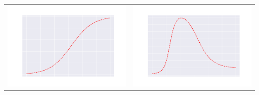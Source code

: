\documentclass{article}
\begin{document}
\begin{tabular}{p{210pt}|p{210pt}}
\\
\hspace{-35pt}
\includegraphics[scale=0.4]{graph_logistic.png}  
& 
\hspace{-30pt}
\includegraphics[scale=0.4]{graph_nn.png}  
\end{tabular}

\end{document}
